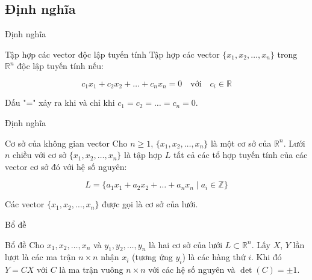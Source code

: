 \documentclass{beamer}
\begin{document}
\subsection{Định nghĩa}
\begin{frame}{Định nghĩa}
\begin{block}{Tập hợp các vector độc lập tuyến tính}
Tập hợp các vector \(\{x_1, x_2, \ldots, x_n\}\) trong \(\mathbb{R}^n\) độc lập tuyến tính nếu:

\begin{equation}
c_1 x_1 + c_2 x_2 + \ldots + c_n x_n = 0 \quad \text{với} \quad c_i \in \mathbb{R}
\end{equation}

Dấu "=" xảy ra khi và chỉ khi \(c_1 = c_2 = \ldots = c_n = 0 \).

\end{block}
\end{frame}
\begin{frame}{Định nghĩa}
\begin{block}{Cơ sở của không gian vector}
Cho \(n \geq 1 \), \(\{x_1, x_2, \ldots, x_n\}\) là một cơ sở của \(\mathbb{R}^n\).
Lưới \(n \) chiều với cơ sở \(\{x_1, x_2, \ldots, x_n\}\)
là tập hợp \(L \) tất cả các tổ hợp tuyến tính của các vector cơ sở đó với hệ số nguyên:

\[
L = \{a_1 x_1 + a_2 x_2 + \ldots + a_n x_n \mid a_i \in \mathbb{Z} \}
\]

Các vector \(\{x_1, x_2, \ldots, x_n\}\) được gọi là cơ sở của lưới.
\end{block}
\end{frame}
\begin{frame}{Bổ đề}
\begin{block}{Bổ đề}
Cho $x_1, x_2, \ldots, x_n$ và $y_1, y_2, \ldots, y_n$ là hai cơ sở của lưới $L \subset \mathbb{R}^n$.
Lấy $X$, $Y$ lần lượt là các ma trận $n \times n$ nhận $x_i$ (tương ứng $y_i$) là các hàng thứ $i$.
Khi đó $Y = CX$ với $C$ là ma trận vuông $n \times n$ với các hệ số nguyên và $\det(C) = \pm 1$.
\end{block}
\end{frame}
\end{document}
